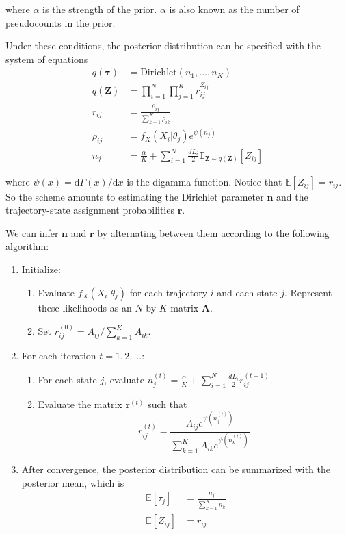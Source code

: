 \documentclass{article}
\renewcommand{\vec}{\mathbf}
\newcommand{\D}{\text{d}}
\begin{document}
where $\alpha$ is the strength of the prior. $\alpha$ is also known as the number of 
pseudocounts in the prior. \newline

Under these conditions, the posterior distribution can be specified with the system of 
equations
\begin{align*}
	q(\boldsymbol{\tau}) &= \text{Dirichlet} \left( n_{1}, ..., n_{K} \right) \\
	q(\vec{Z}) &= \prod\limits_{i=1}^{N} \prod\limits_{j=1}^{K} r_{ij}^{Z_{ij}} \\
	r_{ij} &= \frac{\rho_{ij}}{\sum\limits_{k=1}^{K} \rho_{ik}} \\
	\rho_{ij} &= f_{X} \left( X_{i} | \theta_{j} \right) e^{\psi (n_{j})} \\
	n_{j} &= \frac{\alpha}{K}  + \sum\limits_{i=1}^{N} \frac{d L_{i}}{2} \mathbb{E}_{\vec{Z} \sim q(\vec{Z})} \left[ Z_{ij} \right] 
\end{align*}

where $\psi(x) = \D \Gamma (x) / \D x$ is the digamma function. Notice that 
$\mathbb{E} \left[ Z_{ij} \right] = r_{ij}$. So the scheme amounts to 
estimating the Dirichlet parameter $\vec{n}$ and the trajectory-state assignment
probabilities $\vec{r}$. \newline

We can infer $\vec{n}$ and $\vec{r}$ by alternating between them according to the 
following algorithm:
\begin{enumerate}
	\item Initialize:
	\begin{enumerate}
		\item Evaluate $f_{X}(X_{i}|\theta_{j})$ for each trajectory $i$ and each state $j$. Represent these likelihoods as an $N$-by-$K$ matrix $\vec{A}$. 
		\item Set $r_{ij}^{(0)} = A_{ij} / \sum\limits_{k=1}^{K} A_{ik}$. 
	\end{enumerate}
	\item For each iteration $t = 1, 2, ...$:
	\begin{enumerate}
		\item For each state $j$, evaluate $n_{j}^{(t)} = \frac{\alpha}{K} + \sum\limits_{i=1}^{N} \frac{d L_{i}}{2} r_{ij}^{(t-1)}$.
		\item Evaluate the matrix $\vec{r}^{(t)}$ such that 
		\[
			r_{ij}^{(t)} = \frac{
				A_{ij} e^{\psi (n_{j}^{(t)})}
			}{
				\sum\limits_{k=1}^{K} A_{ik} e^{\psi (n_{k}^{(t)})}
			}
		\]
	\end{enumerate}
	\item After convergence, the posterior distribution can be summarized with the posterior mean, which is 
	\begin{align*}
		\mathbb{E} \left[ \tau_{j} \right] &= \frac{n_{j}}{\sum\limits_{k=1}^{K} n_{k}} \\
		\mathbb{E} \left[ Z_{ij} \right] &= r_{ij}
	\end{align*}
\end{enumerate}
\end{document}
